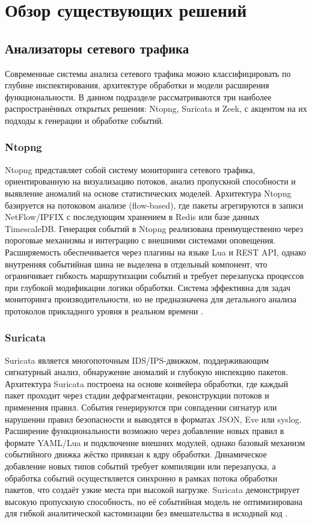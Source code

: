 \section{Обзор существующих решений}
\subsection{Анализаторы сетевого трафика}
Современные системы анализа сетевого трафика можно классифицировать по глубине инспектирования, архитектуре обработки и модели расширения функциональности. В данном подразделе рассматриваются три наиболее распространённых открытых решения: Ntopng, Suricata и Zeek, с акцентом на их подходы к генерации и обработке событий.

\subsubsection{Ntopng}
Ntopng представляет собой систему мониторинга сетевого трафика, ориентированную на визуализацию потоков, анализ пропускной способности и выявление аномалий на основе статистических моделей. Архитектура Ntopng базируется на потоковом анализе (flow-based), где пакеты агрегируются в записи NetFlow/IPFIX с последующим хранением в Redis или базе данных TimescaleDB. Генерация событий в Ntopng реализована преимущественно через пороговые механизмы и интеграцию с внешними системами оповещения. Расширяемость обеспечивается через плагины на языке Lua и REST API, однако внутренняя событийная шина не выделена в отдельный компонент, что ограничивает гибкость маршрутизации событий и требует перезапуска процессов при глубокой модификации логики обработки. Система эффективна для задач мониторинга производительности, но не предназначена для детального анализа протоколов прикладного уровня в реальном времени \cite{ntopng2023doc}.

\subsubsection{Suricata}
Suricata является многопоточным IDS/IPS-движком, поддерживающим сигнатурный анализ, обнаружение аномалий и глубокую инспекцию пакетов. Архитектура Suricata построена на основе конвейера обработки, где каждый пакет проходит через стадии дефрагментации, реконструкции потоков и применения правил. События генерируются при совпадении сигнатур или нарушении правил безопасности и выводятся в форматах JSON, Eve или syslog. Расширение функциональности возможно через добавление новых правил в формате YAML/Lua и подключение внешних модулей, однако базовый механизм событийного движка жёстко привязан к ядру обработки. Динамическое добавление новых типов событий требует компиляции или перезапуска, а обработка событий осуществляется синхронно в рамках потока обработки пакетов, что создаёт узкие места при высокой нагрузке. Suricata демонстрирует высокую пропускную способность, но её событийная модель не оптимизирована для гибкой аналитической кастомизации без вмешательства в исходный код \cite{suricata2023arch}.

